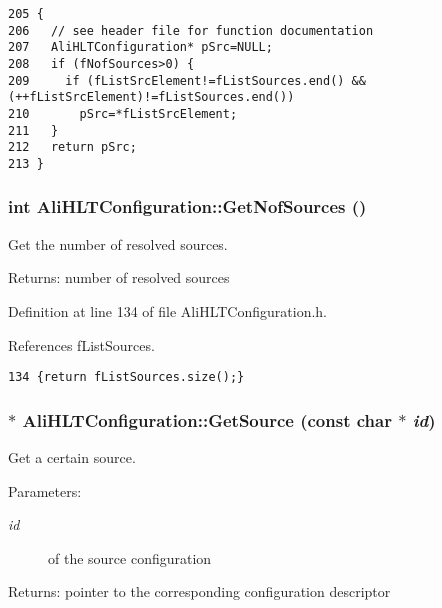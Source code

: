 \footnotesize\begin{verbatim}205 {
206   // see header file for function documentation
207   AliHLTConfiguration* pSrc=NULL;
208   if (fNofSources>0) {
209     if (fListSrcElement!=fListSources.end() && (++fListSrcElement)!=fListSources.end()) 
210       pSrc=*fListSrcElement;
211   } 
212   return pSrc;
213 }
\end{verbatim}\normalsize 


\subsubsection{\setlength{\rightskip}{0pt plus 5cm}int Ali\-HLTConfiguration::Get\-Nof\-Sources ()\hspace{0.3cm}{\tt  [inline]}}\label{classAliHLTConfiguration_a10}


Get the number of resolved sources. \begin{Desc}
\item[Returns:]number of resolved sources \end{Desc}


Definition at line 134 of file Ali\-HLTConfiguration.h.

References f\-List\-Sources.

\footnotesize\begin{verbatim}134 {return fListSources.size();}
\end{verbatim}\normalsize 


\subsubsection{ $\ast$ Ali\-HLTConfiguration::Get\-Source (const char $\ast$ {\em id})}\label{classAliHLTConfiguration_a8}


Get a certain source. \begin{Desc}
\item[Parameters:]
\begin{description}
\item[{\em id}]of the source configuration \end{description}
\end{Desc}
\begin{Desc}
\item[Returns:]pointer to the corresponding configuration descriptor \end{Desc}


